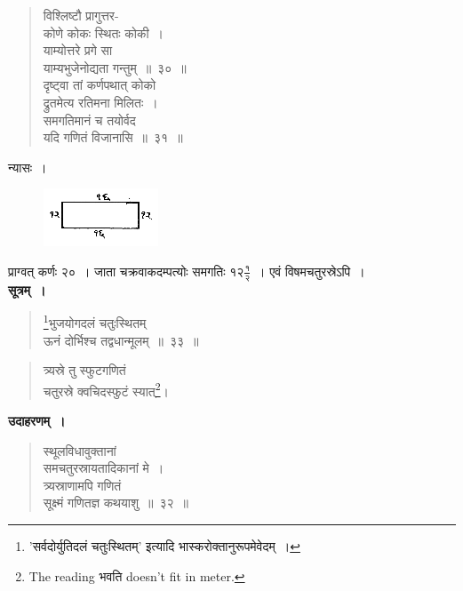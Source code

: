 \documentclass[11pt, openany]{book}
\begin{document}
\newpage%
\begin{quote}
    \bqt 
     विश्लिष्टौ प्रागुत्तर-\\
     कोणे कोकः स्थितः कोकी~।\\
याम्योत्तरे प्रगे सा \\
याम्यभुजेनोद्यता गन्तुम्~॥~३०~॥\\
दृष्ट्वा तां कर्णपथात् कोको \\
द्रुतमेत्य रतिमना मिलितः~।\\
समगतिमानं च तयोर्वद \\
यदि गणितं विजानासि~॥~३१~॥
\end{quote}

 न्यासः~। 
\vspace{-2mm}

\begin{figure}[h!]
    \centering
    \includegraphics[scale=0.8]{graphics/capture38.png}
\end{figure}
\vspace{-3mm}

 प्राग्वत् कर्णः २०~। जाता चक्रवाकदम्पत्योः समगतिः $\mbox{१२}\frac{\mbox{१}}{\mbox{२}}$~। एवं
विषमचतुरस्रेऽपि~। \\

 \label{4.33}
\setcounter{footnote}{0}
 \textbf{सूत्रम्~।} 
\begin{quote}
    \bs 
 \footnote{'{\color{violet}सर्वदोर्युतिदलं चतुःस्थितम्}' इत्यादि {\color{violet}भास्करो}क्तानुरूपमेवेदम्~। }भुजयोगदलं चतुःस्थितम् \\
 ऊनं दोर्भिश्च तद्वधान्मूलम्~॥~३३~॥
\end{quote}

\newpage%

\begin{quote}
    \bs 
 त्र्यस्रे तु स्फुटगणितं \\
 चतुरस्रे क्वचिदस्फुटं स्यात्\footnote{The reading भवति doesn't fit in meter.}।
\end{quote}

 \textbf{उदाहरणम्~।} 
\begin{quote}
    \bqt 
     स्थूलविधावुक्तानां \\
     समचतुरस्रायतादिकानां मे~।\\
त्र्यस्राणामपि गणितं \\
सूक्ष्मं गणितज्ञ कथयाशु~॥~३२~॥
\end{quote}
\end{document}
